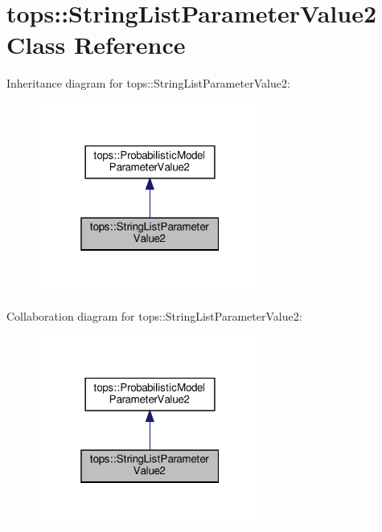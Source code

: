 \hypertarget{classtops_1_1StringListParameterValue2}{}\section{tops\+:\+:String\+List\+Parameter\+Value2 Class Reference}
\label{classtops_1_1StringListParameterValue2}


Inheritance diagram for tops\+:\+:String\+List\+Parameter\+Value2\+:
\nopagebreak
\begin{figure}[H]
\begin{center}
\leavevmode
\includegraphics[width=208pt]{classtops_1_1StringListParameterValue2__inherit__graph}
\end{center}
\end{figure}


Collaboration diagram for tops\+:\+:String\+List\+Parameter\+Value2\+:
\nopagebreak
\begin{figure}[H]
\begin{center}
\leavevmode
\includegraphics[width=208pt]{classtops_1_1StringListParameterValue2__coll__graph}
\end{center}
\end{figure}
